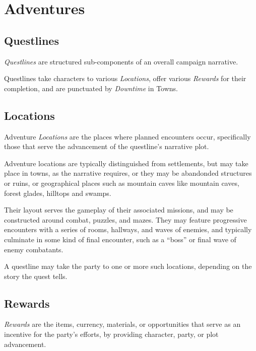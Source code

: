 

\chapter{Adventures}

\section{Questlines}
\textit{Questlines} are structured sub-components of an overall campaign narrative.

\vspace{0.4em}

Questlines take characters to various \textit{Locations}, 
offer various \textit{Rewards} for their completion, 
and are punctuated by \textit{Downtime} in Towns.


\section{Locations}
Adventure \textit{Locations} are the places where planned encounters occur, 
specifically those that serve the advancement of the questline's narrative plot.

\vspace{0.4em}

Adventure locations are typically distinguished from settlements, but may take place in towns,
as the narrative requires, or they may be abandonded structures or ruins,
or geographical places such as mountain caves like mountain caves, forest glades, 
hilltops and swamps.

\vspace{0.4em}

Their layout serves the gameplay of their associated missions, 
and may be constructed around combat, puzzles, and mazes.
They may feature progressive encounters with a series of rooms, hallways, and waves of enemies,
and typically culminate in some kind of final encounter, such as a ``boss'' or final wave of enemy combatants.

\vspace{0.4em}

A questline may take the party to one or more such locations, depending on the story the quest tells.


\newpage

\section{Rewards}
\textit{Rewards} are the items, currency, materials, or opportunities that serve as an incentive 
for the party's efforts, by providing character, party, or plot advancement.

